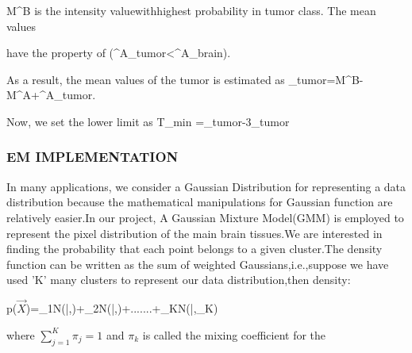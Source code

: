        \hspace{2mm}M^B\hspace{2mm} is \hspace{2mm} the\hspace{2mm}  intensity \hspace{2mm}value\hspace{2 mm}with\hspace{2 mm}highest\hspace{2 mm} probability \hspace{2mm} in\hspace{2 mm} tumor\hspace{2mm} class.
      \hspace{2 mm}The\hspace{2mm} mean \hspace{2mm}values 
      
      \hspace{2 mm}have\hspace{2 mm} the\hspace{2mm} property\hspace{2mm} of (\mu^A_{tumor}<\mu^A_{brain}). 



     As a result, the mean values of the tumor is estimated as \newline\mu_{tumor}=M^B-M^A+\mu^A_{tumor}.


     Now, we set the lower limit as T_{min} =\mu_{tumor}-3\sigma_{tumor}


      
\subsubsection{EM IMPLEMENTATION}
In many applications, we consider a Gaussian Distribution for representing a data distribution because the mathematical manipulations for Gaussian function are relatively easier.In our project, A Gaussian Mixture Model(GMM) is employed to represent the pixel distribution of the main brain tissues.We are interested in finding the probability that each point belongs to a given cluster.The density function can be written as the sum of weighted Gaussians,i.e.,suppose we have used 'K' many clusters to represent our data  distribution,then density:

p($\vec{X}$)=\pi_{1}N(|,)+\pi_{2}N(|,)+.......+\pi_{K}N(|,\Sigma_{K})

where $\sum_{j=1}^{K} \pi_{j} = 1$  and $\pi_{k}$ is called the mixing coefficient for the 

